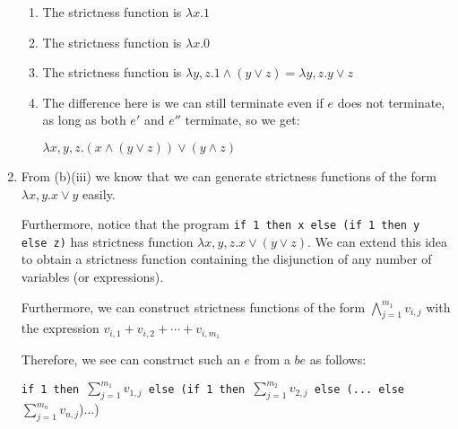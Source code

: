 \begin{enumerate}[label=(\alph*)]
\begin{enumerate}[label=(\roman*)]
      \item

        The strictness function is $\lambda x. 1$

      \item
        The strictness function is $\lambda x. 0$

      \item
        The strictness function is $\lambda y,z. 1 \wedge (y \vee z) = \lambda y,z. y \vee z$

      \item
        The difference here is we can still terminate even if $e$ does not terminate, as long as both $e'$ and $e''$ terminate, so we get:

        $\lambda x,y,z. (x \wedge (y \vee z)) \vee (y \wedge z)$
    \end{enumerate}

  \item
    From (b)(iii) we know that we can generate strictness functions of the form $\lambda x,y. x \vee y$ easily.

    Furthermore, notice that the program \texttt{if 1 then x else (if 1 then y else z)} has strictness function $\lambda x,y,z. x \vee (y \vee z)$. We can extend this idea to obtain a strictness function containing the disjunction of any number of variables (or expressions).

    Furthermore, we can construct strictness functions of the form $\bigwedge_{j=1}^{m_1}v_{i,j}$ with the expression $v_{i,1} + v_{i,2} + \cdots + v_{i, m_1}$

    Therefore, we see can construct such an $e$ from a $be$ as follows:

    \texttt{if 1 then }$\sum_{j=1}^{m_1} v_{1,j}$\texttt{ else (if 1 then }$\sum_{j=1}^{m_2} v_{2,j}$\texttt{ else (... else}$\sum_{j=1}^{m_n} v_{n, j}$)...)

    

        
\end{enumerate}

